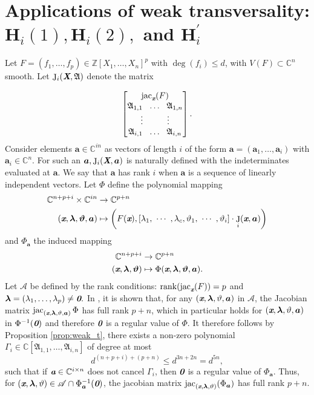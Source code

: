 \documentclass[a4paper]{article}
\def\sA{\mathscr{A}}
\def\A{\mathfrak{A}}
\def\bz{\textit{\textbf{0}}}
\def\Xb{\textit{\textbf{X}}}
\def\xb{\textit{\textbf{x}}}
\def\ab{\textit{\textbf{a}}}
\def\vt{\vartheta}
\DeclareMathOperator{\J}{J}
\DeclareMathOperator{\jac}{jac}
\DeclareMathOperator{\rk}{rank}
\newcommand{\ZZ}{{\mathbb{Z}}}
\def\C{\mathbb{C}}
\def\bbm{\begin{bmatrix}}
\def\ebm{\end{bmatrix}}
\begin{document}
\section{Applications of weak transversality: $\textbf{H}_i(1), \textbf{H}_i(2),$ and $\textbf{H}_i^{'}$}\label{sec:5}

Let $F=(f_1,\hdots,f_p) \in \ZZ[X_1,\hdots,X_n]^p$ with $\deg(f_i)\leq d$, with $V(F)
\subset \C^n$ smooth. Let $\J_i(\Xb,\A)$ denote the matrix
    
    \[
    \bbm 
    \jac_{\xb}(F)\\
    \A_{1,1}~~ \hdots ~~\A_{1,n}\\
    \vdots\hspace{10mm}\vdots\\
     \A_{i,1}~~ \hdots ~~\A_{i,n}
     \ebm.
    \]
Consider elements $\bm a \in \C^{in}$ as vectors of length $i$ of the form $\bm a = (\bm a_1,\hdots,\bm a_i)$ with $\bm a_i \in \C^n$. For such an $\bm a, \J_i(\Xb,\bm a)$ is naturally defined with the indeterminates evaluated at $\bm a$. We say that $\bm a$ has rank $i$ when $\bm a$ is a sequence of linearly independent vectors. Let $\Phi$ define the polynomial mapping
    \begin{align*}
    \C^{n+p+i}\times \C^{i n} &\rightarrow \C^{p+n}\\
    (\xb,\bm \lambda,\bm \vt, \bm a)&
    \mapsto
    \left(F(\xb),[\lambda_1, ~\cdots~, \lambda_c, \vt_1, ~\cdots~, \vt_i ] \cdot 
    \J_i(\xb,\bm a)
    \right)
    \end{align*}
    and $\Phi_{\bm a}$ the induced mapping   
    \begin{align*}
    \C^{n+p+i} &\rightarrow \C^{p+n}\\
    (\xb,\bm \lambda,\bm \vt)&\mapsto \Phi(\xb,\bm \lambda,\bm \vt,\bm a).
    \end{align*}
    Let $\sA$ be defined by the rank conditions: $\rk (\jac_{\xb}(F))=p$ and $\bm \lambda=(\lambda_1,\hdots,\lambda_p) \not = \bz.$ In \cite[Section 3.2]{BaGiHeSaSh10}, it is shown that, for any $(\xb, \bm \lambda, \vt, \bm a)$ in $\sA$, the Jacobian matrix $\jac_{(\xb, \bm \lambda, \vt, \bm a)}\Phi$ has full rank $p + n$, which in particular holds for $(\xb, \bm \lambda, \vt, \bm a)$ in $\Phi^{-1}(\bz)$ and therefore $\bz$ is a regular value of $\Phi.$ It therefore follows by Proposition \ref{prop:weak_t}, there exists a non-zero polynomial $\Gamma_i \in \C[\A_{1,1},\hdots,\A_{i,n}]$ of degree at most 
    \[
    d^{(n+p+i)+(p+n)} \leq d^{3n+2n} = d^{5n},
    \]
    such that if $\ab \in \C^{i \times n}$ does not cancel $\Gamma_i$, then $\bz$ is a regular value of $\Phi_{\bm a}.$ Thus, for $(\xb, \bm \lambda, \vt) \in \sA \cap \Phi^{-1}_{\bm a}(\bz)$, the jacobian matrix $\jac_{(\xb, \bm \lambda, \vt)}(\Phi_{\bm a})$ has full rank $p+n$.  
    
\end{document}
